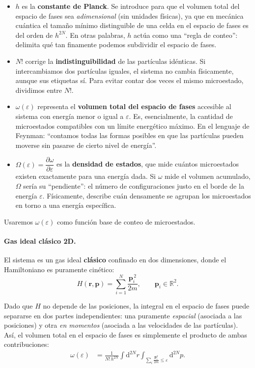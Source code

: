 \documentclass{article}
\begin{document}
\begin{itemize}
  \item \(h\) es la \textbf{constante de Planck}.  
  Se introduce para que el volumen total del espacio de fases sea \emph{adimensional} (sin unidades físicas), ya que en mecánica cuántica el tamaño mínimo distinguible de una celda en el espacio de fases es del orden de \(h^{2N}\).  
  En otras palabras, \(h\) actúa como una “regla de conteo”: delimita qué tan finamente podemos subdividir el espacio de fases.

  \item \(N!\) corrige la \textbf{indistinguibilidad} de las partículas idénticas.  
  Si intercambiamos dos partículas iguales, el sistema no cambia físicamente, aunque sus etiquetas sí.  
  Para evitar contar dos veces el mismo microestado, dividimos entre \(N!\).

  \item \(\omega(\varepsilon)\) representa el \textbf{volumen total del espacio de fases} accesible al sistema con energía menor o igual a \(\varepsilon\).  
  Es, esencialmente, la cantidad de microestados compatibles con un límite energético máximo.  
  En el lenguaje de Feynman: “contamos todas las formas posibles en que las partículas pueden moverse sin pasarse de cierto nivel de energía”.

  \item \(\Omega(\varepsilon)=\dfrac{\partial \omega}{\partial \varepsilon}\) es la \textbf{densidad de estados}, que mide cuántos microestados existen exactamente para una energía dada.  
  Si \(\omega\) mide el volumen acumulado, \(\Omega\) sería su “pendiente”: el número de configuraciones justo en el borde de la energía \(\varepsilon\).  
  Físicamente, describe cuán densamente se agrupan los microestados en torno a una energía específica.
\end{itemize}


\noindent
Usaremos \(\omega(\varepsilon)\) como función base de conteo de microestados.

\paragraph{Gas ideal clásico 2D.}

El sistema es un gas ideal \textbf{clásico} confinado en dos dimensiones, donde el Hamiltoniano es puramente cinético:
\[
H(\mathbf r,\mathbf p)=\sum_{i=1}^{N}\frac{\mathbf p_i^{\,2}}{2m},
\qquad \mathbf p_i\in\mathbb R^2.
\]

\medskip
Dado que \(H\) no depende de las posiciones, la integral en el espacio de fases puede separarse en dos partes independientes: una puramente \emph{espacial} (asociada a las posiciones) y otra \emph{en momentos} (asociada a las velocidades de las partículas). Así, el volumen total en el espacio de fases es simplemente el producto de ambas contribuciones:
\begin{equation*}
\begin{split}
\omega(\varepsilon)
&=\frac{1}{N!\,h^{2N}}
\int \mathrm d^{2N}r
\int_{\sum_{i}\frac{\mathbf p_i^{2}}{2m}\le \varepsilon}\mathrm d^{2N}p.
\end{split}
\end{equation*}
\end{document}
